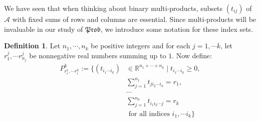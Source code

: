 \documentclass[a4paper]{amsproc}
\theoremstyle{plain}
\theoremstyle{definition}
\newtheorem{definition}[theorem]{Definition}
\theoremstyle{remark}
\numberwithin{equation}{section}
\newcommand{\Prob}{\mathfrak{Prob}}
\begin{document}
We have seen that when thinking about binary multi-products, subsets $(t_{ij})$ of $\mathcal{A}$ with fixed sums of rows and columns are essential. Since multi-products will be invaluable in our study of $\Prob$, we introduce some notation for these index sets.

\begin{definition}
    Let $n_1, \cdots, n_k$ be positive integers and for each $j = 1, \cdots k$, let $r^j_1, \cdots r^j_{n_j}$ be nonnegative real numbers summing up to $1$. Now define:
    \begin{equation*}
        \begin{split}
            P^k_{r_i^1,\cdots r_i^k} := \{ (t_{i_1 \cdots i_k}) &\in \mathbb{R}^{n_1 \times \cdots \times n_k} \mid t_{i_1 \cdots i_k} \geq 0, \\
            & \sum_{j=1}^{n_1} t_{j i_2 \cdots i_k} = r_1, \\
            & \cdots \\
            & \sum_{j=1}^{n_k} t_{i_1 i_2 \cdots j} = r_k \\
            & \text{ for all indices } i_1, \cdots i_k \}
        \end{split}
    \end{equation*}
\end{definition}
\end{document}
